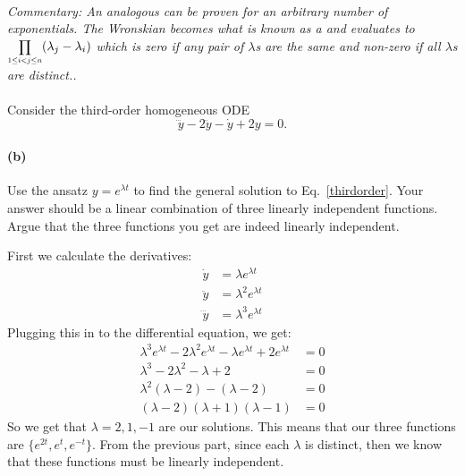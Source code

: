 \documentclass{article}
\begin{document}
\paragraph{}
\noindent\emph{Commentary: An analogous can be proven for an arbitrary number of exponentials.  The Wronskian becomes what is known as a  and 
evaluates to $\scalemath{0.8}{\prod_{1\leq i<j\leq n}} (\lambda_{j}-\lambda_{i})$ which is zero if any pair of $\lambda$s are the same and non-zero if all $\lambda$s are distinct..}

\phline
\paragraph{}
Consider the third-order homogeneous ODE
	\begin{equation}
		\dddot{y} - 2\ddot{y} - \dot{y} + 2y= 0.
	\label{thirdorder}
	\end{equation}

\paragraph{(b)}
Use the ansatz $y = e^{\lambda t}$ to find the general solution to Eq.~\ref{thirdorder}.  Your answer should be a linear
combination of three linearly independent functions.  Argue that the three functions you get are indeed linearly independent.

\begin{solution}
	First we calculate the derivatives:
	\begin{align*}
		\dot y &= \lambda e^{\lambda t}\\
		\ddot y &= \lambda^2 e^{\lambda t} \\
		\dddot y &= \lambda^3 e^{\lambda t}
	\end{align*}
	Plugging this in to the differential equation, we get:
	\begin{align*}
		\lambda^3 e^{\lambda t} - 2 \lambda^2 e^{\lambda t} - \lambda e^{\lambda t} + 2e^{\lambda t} &= 0\\
		\lambda^3 - 2\lambda^2 - \lambda + 2 &=  0 \\
		\lambda^2(\lambda - 2) - (\lambda - 2) &=  0 \\
		(\lambda - 2)(\lambda +1)(\lambda -1) &= 0
	\end{align*}
	So we get that $\lambda = 2, 1, -1$ are our solutions. This means that our three functions are $\{e^{2t}, 
	e^{t}, e^{-t}\}$. From the previous part, since each $\lambda$ is distinct, then we know that 
	these functions must be linearly independent.
\end{solution}
\end{document}

